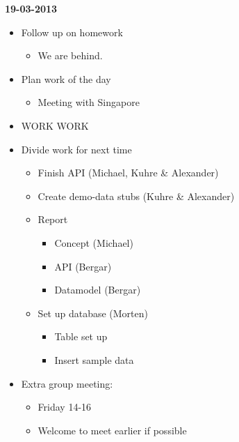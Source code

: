 \documentclass[11pt]{article}
\begin{document}
\begin{landscape}
\begin{multicols}{2}
\textbf{19-03-2013}
\begin{itemize}
\item Follow up on homework
\begin{itemize}
\item We are behind.
\end{itemize}
\item Plan work of the day
\begin{itemize}
\item Meeting with Singapore
\end{itemize}
\item WORK WORK
\item Divide work for next time
\begin{itemize}
\item Finish API (Michael, Kuhre \& Alexander)
\item Create demo-data stubs (Kuhre \& Alexander)
\item Report
\begin{itemize}
\item Concept (Michael)
\item API (Bergar)
\item Datamodel (Bergar)
\end{itemize}
\item Set up database (Morten)
\begin{itemize}
\item Table set up
\item Insert sample data
\end{itemize}
\end{itemize}
\item Extra group meeting:
\begin{itemize}
\item Friday 14-16
\item Welcome to meet earlier if possible
\end{itemize}
\end{itemize}


\end{multicols}
\end{landscape}
\end{document}
